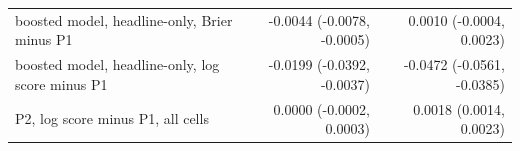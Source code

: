 \begin{tabular}{lrr}
boosted model, headline-only, Brier minus P1 & -0.0044 (-0.0078, -0.0005) & 0.0010 (-0.0004, 0.0023) \\
boosted model, headline-only, log score minus P1 & -0.0199 (-0.0392, -0.0037) & -0.0472 (-0.0561, -0.0385) \\
P2, log score minus P1, all cells & 0.0000 (-0.0002, 0.0003) & 0.0018 (0.0014, 0.0023) \\

\end{tabular}
